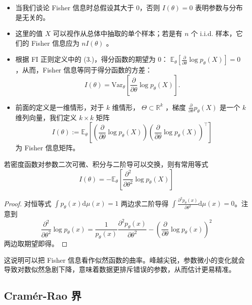\begin{remark}

\begin{itemize}
\tightlist
\item
  当我们谈论 Fisher 信息时总假设其大于 0，否则 $I(\theta)=0$ 表明参数与分布是无关的。
\item
  这里的值 $X$ 可以视作从总体中抽取的单个样本；若是有 $n$ 个 i.i.d. 样本，它们的 Fisher 信息应为 $nI(\theta)$ 。
\item
  根据 FI 正则定义中的 (3.)，得分函数的期望为 0： $\mathbb E_\theta\left[\tfrac{\partial }{\partial\theta}\log p_\theta(X)\right]=0$ ，从而，Fisher 信息等同于得分函数的方差：
  \[
  I(\theta)=\mathrm{Var}_\theta\left[\frac{\partial}{\partial\theta}\log p_\theta(X)\right].
  \]
\item
  前面的定义是一维情形，对于 $k$ 维情形， $\Theta\subset \mathbb R^k$ ，梯度 $\tfrac{\partial }{\partial\theta}p_\theta(X)$ 是一个 $k$ 维列向量，我们定义 $k\times k$ 矩阵\[ I(\theta):=\mathbb{E}_\theta\left[\left(\frac{\partial}{\partial\theta}\log p_\theta(X)\right)\left(\frac{\partial}{\partial\theta}\log p_\theta(X)\right)^\top\right] \]为 Fisher 信息矩阵。
\end{itemize}

\end{remark}

若密度函数对参数二次可微、积分与二阶导可以交换，则有常用等式
\[I(\theta)=-\mathbb{E}_\theta\left[\frac{\partial^2}{\partial\theta^2}\log p_\theta(X)\right]\]
\begin{proof}

对恒等式 $\int p_\theta(x)\mathrm d\mu(x)=1$ 两边求二阶导得 $\int\tfrac{\partial^2 p_\theta (x)}{\partial\theta^2}\mathrm d\mu(x)=0$。注意到 \[ \frac{\partial^2}{\partial\theta^2}\log p_\theta(x)=\frac{1}{p_\theta(x)}\frac{\partial^2 p_\theta(x)}{\partial\theta^2} -\left(\frac{\partial}{\partial\theta}\log p_\theta(x)\right)^2 \]两边取期望即得。

\end{proof}

这说明可以把 Fisher 信息看作似然函数的曲率。峰越尖锐，参数微小的变化就会导致对数似然急剧下降，意味着数据更排斥错误的参数，从而估计更易精准。

\subsection{Cramér-Rao 界}

